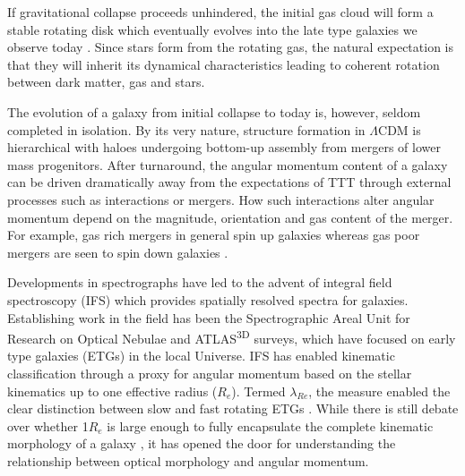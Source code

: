 \documentclass[fleqn,usenatbib]{mnras}
\begin{document}
If gravitational collapse proceeds unhindered, the initial gas cloud will form a stable rotating disk which eventually evolves into the late type galaxies we observe today \citep{white1978}. Since stars form from the rotating gas, the natural expectation is that they will inherit its dynamical characteristics leading to coherent rotation between dark matter, gas and stars. 

The evolution of a galaxy from initial collapse to today is, however, seldom completed in isolation. By its very nature, structure formation in $\Lambda$CDM is hierarchical with haloes undergoing bottom-up assembly from mergers of lower mass progenitors. After turnaround, the angular momentum content of a galaxy can be driven dramatically away from the expectations of TTT through external processes such as interactions or mergers. How such interactions alter angular momentum depend on the magnitude, orientation and gas content of the merger. For example, gas rich mergers in general spin up galaxies whereas gas poor mergers are seen to spin down galaxies \citep[][]{lagos2017,lagos2018}.


Developments in spectrographs have led to the advent of integral field spectroscopy (IFS) which provides spatially resolved spectra for galaxies. Establishing work in the field has been the Spectrographic Areal Unit for Research on Optical Nebulae \citep[SAURON;][]{sauron} and ATLAS\textsuperscript{3D} \citep{atlas3d} surveys, which have focused on early type galaxies (ETGs) in the local Universe. IFS has enabled kinematic classification through a proxy for angular momentum based on the stellar kinematics up to one effective radius ($R_e$). Termed $\lambda_{Re}$, the measure enabled the clear distinction between slow and fast rotating ETGs \citep{emsellem2007, emsellem2011}. While there is still debate over whether 1$R_{e}$ is large enough to fully encapsulate the complete kinematic morphology of a galaxy \citep{foster2013,arnold2014}, it has opened the door for understanding the relationship between optical morphology and angular momentum. 
\end{document}
